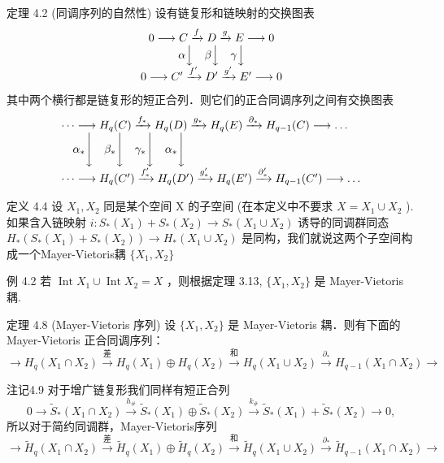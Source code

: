 \documentclass[]{article}
\begin{document}
定理 4.2 (同调序列的自然性) 设有链复形和链映射的交换图表 $$
\begin{array}{c} 0 \longrightarrow C \xrightarrow {f} D \xrightarrow {g} E \longrightarrow 0 \\ \alpha \Big \downarrow \quad \beta \Big \downarrow \quad \gamma \Big \downarrow \\ 0 \longrightarrow C ^ {\prime} \xrightarrow {f ^ {\prime}} D ^ {\prime} \xrightarrow {g ^ {\prime}} E ^ {\prime} \longrightarrow 0 \end{array}
$$其中两个横行都是链复形的短正合列．则它们的正合同调序列之间有交换图表 $$
\begin{array}{l} \dots \longrightarrow H _ {q} (C) \xrightarrow {f _ {*}} H _ {q} (D) \xrightarrow {g _ {*}} H _ {q} (E) \xrightarrow {\partial_ {*}} H _ {q - 1} (C) \longrightarrow \dots \\ \quad \alpha_ {*} \Biggl \downarrow \quad \beta_ {*} \Biggl \downarrow \quad \gamma_ {*} \Biggl \downarrow \quad \alpha_ {*} \Biggl \downarrow \\ \dots \longrightarrow H _ {q} (C ^ {\prime}) \xrightarrow {f _ {*} ^ {\prime}} H _ {q} (D ^ {\prime}) \xrightarrow {g _ {*} ^ {\prime}} H _ {q} (E ^ {\prime}) \xrightarrow {\partial_ {*} ^ {\prime}} H _ {q - 1} (C ^ {\prime}) \longrightarrow \dots \end{array}
$$

定义 4.4 设 $X_{1}, X_{2}$ 同是某个空间 X 的子空间 (在本定义中不要求 $X = X_{1} \cup X_{2}$ ). 如果含入链映射 $i: S_{*}(X_{1}) + S_{*}(X_{2}) \to S_{*}(X_{1} \cup X_{2})$ 
诱导的同调群同态 $H_{*}(S_{*}(X_{1}) + S_{*}(X_{2}))\to H_{*}(X_{1}\cup X_{2})$ 是同构，我们就说这两个子空间构成一个Mayer-Vietoris耦 $\{X_1,X_2\}$ 

例 4.2 若 $\operatorname{Int} X_{1} \cup \operatorname{Int} X_{2} = X$ ，则根据定理 3.13, $\{X_{1}, X_{2}\}$ 是 Mayer-Vietoris 耦. 

定理 4.8 (Mayer-Vietoris 序列) 设 $\{X_{1}, X_{2}\}$ 是 Mayer-Vietoris 耦．则有下面的 Mayer-Vietoris 正合同调序列：$$
\rightarrow H _ {q} (X _ {1} \cap X _ {2}) {\overset {\mathrm{差}} {\longrightarrow}} H _ {q} (X _ {1}) \oplus H _ {q} (X _ {2}) {\overset {\mathrm{和}} {\longrightarrow}} H _ {q} (X _ {1} \cup X _ {2}) {\overset {\partial_ {*}} {\longrightarrow}} H _ {q - 1} (X _ {1} \cap X _ {2}) \rightarrow
$$ 

注记4.9 对于增广链复形我们同样有短正合列 $$
0 \longrightarrow \widetilde {S} _ {*} (X _ {1} \cap X _ {2}) \stackrel {h _ {\#}} {\longrightarrow} \widetilde {S} _ {*} (X _ {1}) \oplus \widetilde {S} _ {*} (X _ {2}) \stackrel {k _ {\#}} {\longrightarrow} \widetilde {S} _ {*} (X _ {1}) + \widetilde {S} _ {*} (X _ {2}) \longrightarrow 0,
$$所以对于简约同调群，Mayer-Vietoris序列 $$
\rightarrow \widetilde {H} _ {q} (X _ {1} \cap X _ {2}) {\xrightarrow {\text {差}}} \widetilde {H} _ {q} (X _ {1}) \oplus \widetilde {H} _ {q} (X _ {2}) {\xrightarrow {\text {和}}} \widetilde {H} _ {q} (X _ {1} \cup X _ {2}) {\xrightarrow {\partial_ {*}}} \widetilde {H} _ {q - 1} (X _ {1} \cap X _ {2}) \rightarrow
$$
\end{document}
